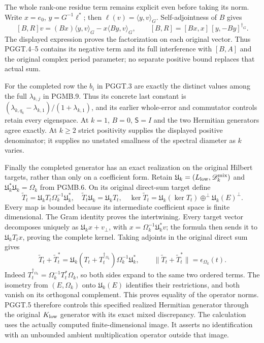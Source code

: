 The whole rank-one residue term remains explicit even
before taking its norm. Write $x=e_0$,
$y=G^{-1}\ell^*$; then $\ell(v)=\langle y,v\rangle_G$.
Self-adjointness of $B$ gives
\[
 [B,R]v=(Bx)\langle y,v\rangle_G
               -x\langle By,v\rangle_G,
 \qquad [B,R]=[Bx,x]\,[y,-By]^{\dagger_G}.
 \tag{PGGT.6}\label{eq:pggt-residue-sign}
\]
The displayed expression proves the factorization on each
original vector. Thus PGGT.4--5 contains its negative
term and its full interference with $[B,A]$ and the
original complex period parameter; no separate positive
bound replaces that actual sum.

For the completed row the $b_i$ in PGGT.3 are exactly the
distinct values among the full $\lambda_{k,j}$ in
PGMB.9. Thus its concrete last constant is
$(\lambda_{k,q_k}-\lambda_{k,1})/(1+\lambda_{k,1})$,
and its earlier whole-error and commutator controls retain
every eigenspace. At $k=1$, $B=0$, $\mathsf S=I$ and
the two Hermitian generators agree exactly. At $k\geq2$
strict positivity supplies the displayed positive
denominator; it supplies no unstated smallness of the
spectral diameter as $k$ varies.

Finally the completed generator has an exact realization
on the original Hilbert targets, rather than only on a
coefficient form. Retain
$\mathfrak U_k=(L_{\rm low},\mathscr D_k^{\rm mix})$
and $\mathfrak U_k^*\mathfrak U_k=\Omega_k$ from PGMB.6.
On its original direct-sum target define
\[
 \widetilde T_t=\mathfrak U_kT_t\Omega_k^{-1}\mathfrak U_k^*,
 \quad\widetilde T_t\mathfrak U_k=\mathfrak U_kT_t,
 \quad\ker\widetilde T_t
 =\mathfrak U_k(\ker T_t)\mathbin{\oplus^\perp}
                                  \mathfrak U_k(E)^\perp.
 \tag{PGGT.7}\label{eq:pggt-realized-generator}
\]
Every map is bounded because its intermediate coefficient
space is finite dimensional. The Gram identity proves
the intertwining. Every target vector decomposes uniquely
as $\mathfrak U_kx+v_\perp$, with $x=\Omega_k^{-1}
\mathfrak U_k^*v$; the formula then sends it to
$\mathfrak U_kT_tx$, proving the complete kernel.
Taking adjoints in the original direct sum gives
\[
 \widetilde T_t+\widetilde T_t^*
 =\mathfrak U_k(T_t+T_t^{\dagger_{\Omega_k}})
                                      \Omega_k^{-1}\mathfrak U_k^*,
 \qquad
 \|\widetilde T_t+\widetilde T_t^*\|
                           =\epsilon_{\Omega_k}(t).
 \tag{PGGT.8}\label{eq:pggt-realized-hermitian-control}
\]
Indeed $T_t^{\dagger_{\Omega_k}}=\Omega_k^{-1}T_t^*\Omega_k$,
so both sides expand to the same two ordered terms. The
isometry from $(E,\Omega_k)$ onto $\mathfrak U_k(E)$
identifies their restrictions, and both vanish on its
orthogonal complement. This proves equality of the
operator norms. PGGT.5 therefore controls this specified
realized Hermitian generator through the original
$K_{\rm low}$ generator with its exact mixed discrepancy.
The calculation uses the actually computed finite-dimensional
image. It asserts no identification with an unbounded
ambient multiplication operator outside that image.
